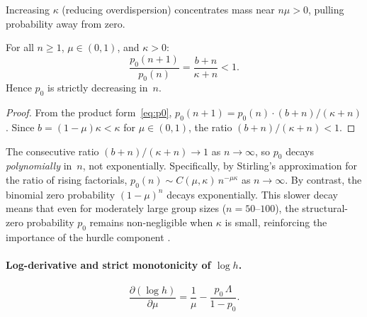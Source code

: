 Increasing $\kappa$ (reducing overdispersion) concentrates mass near
$n\mu > 0$, pulling probability away from zero.

\begin{proposition}[Monotonicity of $p_0$ in $n$]\label{sma:prop-p0-n}
  For all $n \ge 1$, $\mu \in (0,1)$, and $\kappa > 0$:
  \begin{equation}\label{sma:eq-p0-ratio-n}
    \frac{p_0(n+1)}{p_0(n)}
    = \frac{b+n}{\kappa+n} < 1.
  \end{equation}
  Hence $p_0$ is strictly decreasing in~$n$.
\end{proposition}

\begin{proof}
  From the product form~\eqref{eq:p0},
  $p_0(n+1) = p_0(n)\cdot(b+n)/(\kappa+n)$.
  Since $b = (1-\mu)\kappa < \kappa$ for $\mu \in (0,1)$, the ratio
  $(b+n)/(\kappa+n) < 1$.
\end{proof}

\begin{remark}\label{sma:rem-p0-decay}
  The consecutive ratio $(b+n)/(\kappa+n) \to 1$ as $n \to \infty$,
  so $p_0$ decays \emph{polynomially} in~$n$, not exponentially.
  Specifically, by Stirling's approximation for the ratio of rising
  factorials, $p_0(n) \sim C(\mu,\kappa)\,n^{-\mu\kappa}$ as
  $n \to \infty$.  By contrast, the binomial zero probability
  $(1-\mu)^n$ decays exponentially.  This slower decay means that
  even for moderately large group sizes ($n = 50$--$100$), the
  structural-zero probability $p_0$ remains non-negligible when $\kappa$
  is small, reinforcing the importance of the hurdle component
  \citep[see also][for a spatial BB application where this phenomenon
  is empirically relevant]{BandyopadhyayEtAl2011}.
\end{remark}


\paragraph{Log-derivative and strict monotonicity of $\log h$.}

\begin{proposition}\label{sma:prop-logderiv}
  \begin{equation}\label{sma:eq-logderiv}
    \frac{\partial(\log h)}{\partial\mu}
    = \frac{1}{\mu} - \frac{p_0\,\Lambda}{1-p_0}.
  \end{equation}
\end{proposition}

